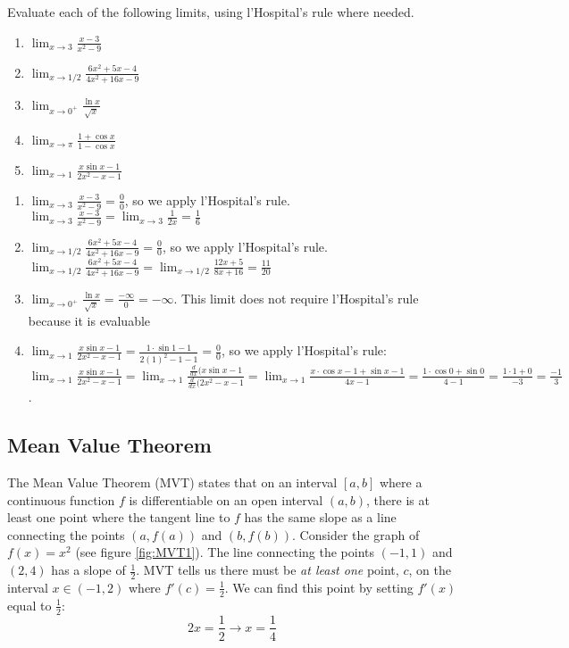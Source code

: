 
\begin{Exercise}[label = LH2]
Evaluate each of the following limits, using l'Hospital's rule where needed.
\begin{enumerate}
\item $\lim_{x \to 3} \frac{x-3}{x^2-9}$
\item $\lim_{x \to 1/2} \frac{6x^2 + 5x - 4}{4x^2 + 16x - 9}$
\item $\lim_{x \to 0^+} \frac{\ln{x}}{\sqrt{x}}$
\item $\lim_{x \to \pi} \frac{1 + \cos{x}}{1 - \cos{x}}$
\item $\lim_{x \to 1} \frac{x\sin{x - 1}}{2x^2 - x - 1}$
\end{enumerate}
\end{Exercise}

\begin{Answer}[ref=LH2]
\begin{enumerate}
\item $\lim_{x \to 3} \frac{x-3}{x^2-9} = \frac{0}{0}$, so we apply l'Hospital's rule. $\lim_{x \to 3} \frac{x-3}{x^2-9} = \lim_{x \to 3} \frac{1}{2x} = \frac{1}{6}$
\item $\lim_{x \to 1/2} \frac{6x^2 + 5x - 4}{4x^2 + 16x - 9} = \frac{0}{0}$, so we apply l'Hospital's rule. $\lim_{x \to 1/2} \frac{6x^2 + 5x - 4}{4x^2 + 16x - 9} = \lim_{x \to 1/2} \frac{12x + 5}{8x + 16} = \frac{11}{20}$
\item $\lim_{x \to 0^+} \frac{\ln{x}}{\sqrt{x}} = \frac{-\infty}{0} = -\infty$. This limit does not require l'Hospital's rule because it is evaluable
\item $\lim_{x \to 1} \frac{x\sin{x - 1}}{2x^2 - x - 1} = \frac{1 \cdot \sin{1 - 1}}{2(1)^2 - 1 - 1} = \frac{0}{0}$, so we apply l'Hospital's rule: $\lim_{x \to 1} \frac{x\sin{x - 1}}{2x^2 - x - 1} = \lim_{x \to 1} \frac{\frac{d}{dx}(x\sin{x-1}}{\frac{d}{dx}(2x^2 - x - 1} = \lim_{x \to 1} \frac{x \cdot \cos{x - 1} + \sin{x - 1}}{4x - 1} = \frac{1 \cdot \cos{0} + \sin{0}}{4 - 1} = \frac{1 \cdot 1 + 0}{-3} = \frac{-1}{3}$. 
\end{enumerate}
\end{Answer}

\subsection{Mean Value Theorem}

The Mean Value Theorem (MVT) states that on an interval $[a, b]$ where a 
continuous function $f$ is differentiable on an open interval $(a, b)$, there 
is at least one point where the tangent line to $f$ has the same slope as a 
line connecting the points $(a, f(a))$ and $(b, f(b))$. Consider the graph of 
$f(x) = x^2$ (see figure \ref{fig:MVT1}). The line connecting the points 
$(-1, 1)$ and $(2, 4)$ has a slope of $\frac{1}{2}$. MVT tells us there must 
be \textit{at least one} point, $c$, on the interval $x \in (-1, 2)$ where 
$f'(c) = \frac{1}{2}$. We can find this point by setting $f'(x)$ equal to 
$\frac{1}{2}$: 
$$2x = \frac{1}{2} \rightarrow x = \frac{1}{4}$$

